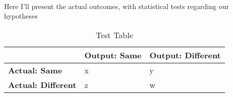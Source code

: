 \paragraph{}
Here I'll present the actual outcomes, with statistical tests regarding our hypotheses

\begin{table}[H]
	\begin{tabular}{|l|l|l|}
		\hline
		\cellcolor{gray} & \textbf{Output: Same} & \textbf{Output: Different} \\ [0.5ex]
		\hline\hline
		\textbf{Actual: Same} & x & y \\ [0.5ex]
		\hline
		\textbf{Actual: Different} & z & w \\ [0.5ex]
		\hline
	\end{tabular}
	\caption{Test Table}
\end{table}

